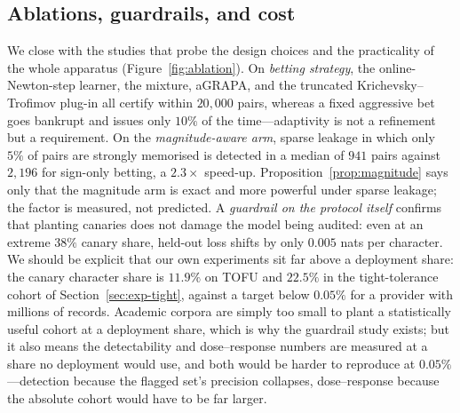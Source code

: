 \subsection{Ablations, guardrails, and cost}\label{sec:exp-ablation}

We close with the studies that probe the design choices and the practicality of the
whole apparatus (Figure~\ref{fig:ablation}). On \emph{betting strategy}, the
online-Newton-step learner, the mixture, aGRAPA, and the truncated
Krichevsky--Trofimov plug-in all certify within $20{,}000$ pairs, whereas a fixed
aggressive bet goes bankrupt and issues only $10\%$ of the time---adaptivity is not a
refinement but a requirement. On the \emph{magnitude-aware arm}, sparse leakage in
which only $5\%$ of pairs are strongly memorised is detected in a median of $941$ pairs
against $2{,}196$ for sign-only betting, a $2.3\times$ speed-up.
Proposition~\ref{prop:magnitude} says only that the magnitude arm is exact and more
powerful under sparse leakage; the factor is measured, not predicted. A \emph{guardrail on the protocol itself} confirms
that planting canaries does not damage the model being audited: even at an extreme
$38\%$ canary share, held-out loss shifts by only $0.005$ nats per character. We should
be explicit that our own experiments sit far above a deployment share: the canary
character share is $11.9\%$ on TOFU and $22.5\%$ in the tight-tolerance cohort of
Section~\ref{sec:exp-tight}, against a target below $0.05\%$ for a provider with
millions of records. Academic corpora are simply too small to plant a
statistically useful cohort at a deployment share, which is why the guardrail study
exists; but it also means the detectability and dose--response numbers are measured at
a share no deployment would use, and both would be harder to reproduce at
$0.05\%$---detection because the flagged set's precision collapses, dose--response
because the absolute cohort would have to be far larger.


